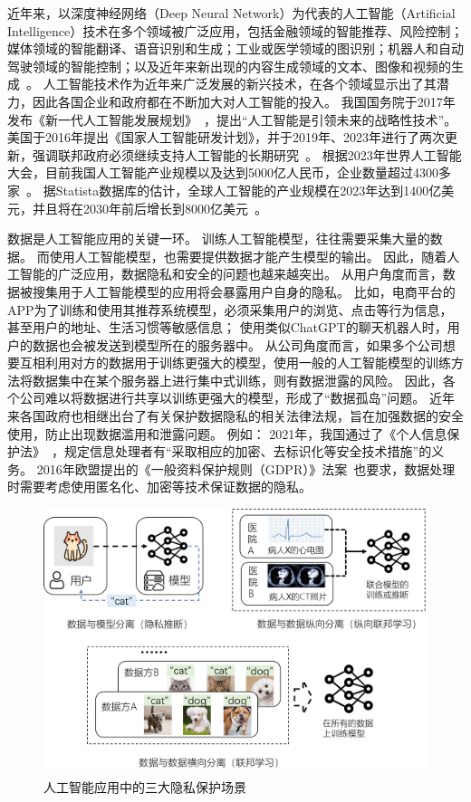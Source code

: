 近年来，以深度神经网络（Deep Neural Network）为代表的人工智能（Artificial Intelligence）技术在多个领域被广泛应用，包括金融领域的智能推荐、风险控制；媒体领域的智能翻译、语音识别和生成；工业或医学领域的图识别；机器人和自动驾驶领域的智能控制；以及近年来新出现的内容生成领域的文本、图像和视频的生成~\cite{lecun2015deep_learning,zhang2021ai_survey,wang2023chatgpt_survey}。
%
人工智能技术作为近年来广泛发展的新兴技术，在各个领域显示出了其潜力，因此各国企业和政府都在不断加大对人工智能的投入。
%
我国国务院于2017年发布《新一代人工智能发展规划》~\cite{china2017ai_plan}，提出“人工智能是引领未来的战略性技术”。
%
美国于2016年提出《国家人工智能研发计划》，并于2019年、2023年进行了两次更新，强调联邦政府必须继续支持人工智能的长期研究~\cite{usa2023ai_plan}。
%
根据2023年世界人工智能大会，目前我国人工智能产业规模以及达到5000亿人民币，企业数量超过4300多家~\cite{2023china_ai_conf}。
%
据Statista数据库的估计，全球人工智能的产业规模在2023年达到1400亿美元，并且将在2030年前后增长到8000亿美元~。

%
数据是人工智能应用的关键一环。
%
训练人工智能模型，往往需要采集大量的数据。
而使用人工智能模型，也需要提供数据才能产生模型的输出。
%
因此，随着人工智能的广泛应用，数据隐私和安全的问题也越来越突出。
%
从用户角度而言，数据被搜集用于人工智能模型的应用将会暴露用户自身的隐私。
%
比如，电商平台的APP为了训练和使用其推荐系统模型，必须采集用户的浏览、点击等行为信息，甚至用户的地址、生活习惯等敏感信息；
使用类似ChatGPT的聊天机器人时，用户的数据也会被发送到模型所在的服务器中。
%
从公司角度而言，如果多个公司想要互相利用对方的数据用于训练更强大的模型，使用一般的人工智能模型的训练方法将数据集中在某个服务器上进行集中式训练，则有数据泄露的风险。
因此，各个公司难以将数据进行共享以训练更强大的模型，形成了“数据孤岛”问题。
%
近年来各国政府也相继出台了有关保护数据隐私的相关法律法规，旨在加强数据的安全使用，防止出现数据滥用和泄露问题。
%
例如：
2021年，我国通过了《个人信息保护法》~\cite{china_personal_information_protection}，规定信息处理者有“采取相应的加密、去标识化等安全技术措施”的义务。
2016年欧盟提出的《一般资料保护规则（GDPR）》法案~\cite{GDPR}也要求，数据处理时需要考虑使用匿名化、加密等技术保证数据的隐私。


\begin{figure}[h]
    \centering
    \includegraphics[width=1\linewidth]{Z_Resources/PPML-overview.png}
    \caption{人工智能应用中的三大隐私保护场景}
    \label{fig:intro:ppml-overview}
\end{figure}


